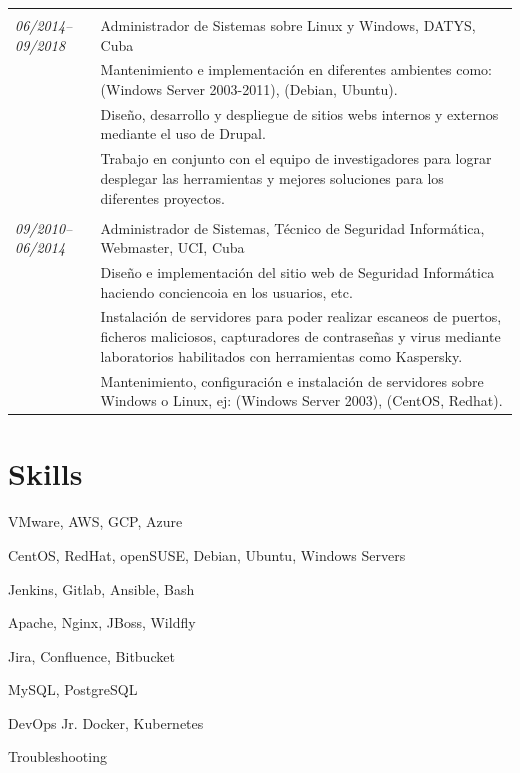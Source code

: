 \documentclass[a4paper,12pt]{article}
\begin{document}
\begin{tabular}{p{2.9cm}| p{16cm}}
\multicolumn{2}{c}{} \\
\emph{06/2014–09/2018} & Administrador de Sistemas sobre Linux y Windows, DATYS, Cuba\\
\textsc{}&\footnotesize{Mantenimiento e implementación en diferentes ambientes como: (Windows Server 2003-2011), (Debian, Ubuntu).}\\
\textsc{}&\footnotesize{Diseño, desarrollo y despliegue de sitios webs internos y externos mediante el uso de Drupal.}\\
\textsc{}&\footnotesize{Trabajo en conjunto con el equipo de investigadores para lograr desplegar las herramientas y mejores soluciones para los diferentes proyectos.}\\

\multicolumn{2}{c}{} \\
\emph{09/2010–06/2014} & Administrador de Sistemas, Técnico de Seguridad Informática, Webmaster, UCI, Cuba\\
\textsc{}&\footnotesize{Diseño e implementación del sitio web de Seguridad Informática haciendo conciencoia en los usuarios, etc.}\\
\textsc{}&\footnotesize{Instalación de servidores para poder realizar escaneos de puertos, ficheros maliciosos, capturadores de contraseñas y virus mediante laboratorios habilitados con herramientas como Kaspersky.}\\
\textsc{}&\footnotesize{Mantenimiento, configuración e instalación de servidores sobre Windows o Linux, ej: (Windows Server 2003), (CentOS, Redhat).}\\
\end{tabular}

\section{Skills}
\justify
\begin{enumerate*}
	\item VMware, AWS, GCP, Azure \hspace{0.15cm}
	\item CentOS, RedHat, openSUSE, Debian, Ubuntu, Windows Servers \hspace{0.15cm}
	\item Jenkins, Gitlab, Ansible, Bash \hspace{0.15cm}
	\item Apache, Nginx, JBoss,  Wildfly \hspace{0.15cm}
	\item Jira, Confluence, Bitbucket \hspace{0.15cm}
	\item MySQL, PostgreSQL \hspace{0.15cm}
	\item DevOps Jr. Docker, Kubernetes \hspace{0.15cm}
	\item Troubleshooting
\end{enumerate*}
\end{document}
